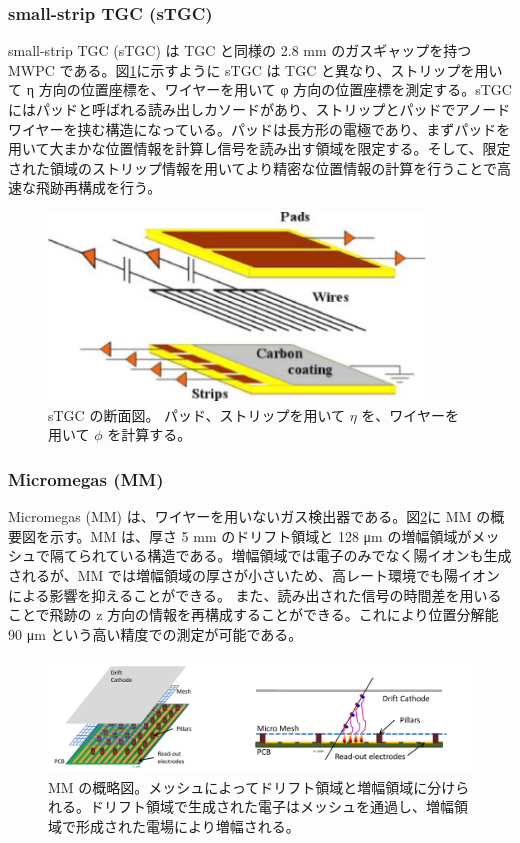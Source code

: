 \subsubsection{small-strip TGC (sTGC)}
small-strip TGC (sTGC) は TGC と同様の 2.8 mm のガスギャップを持つ MWPC である。図\ref{fig:sTGC}に示すように sTGC は TGC と異なり、ストリップを用いて η 方向の位置座標を、ワイヤーを用いて φ 方向の位置座標を測定する。sTGC にはパッドと呼ばれる読み出しカソードがあり、ストリップとパッドでアノードワイヤーを挟む構造になっている。パッドは長方形の電極であり、まずパッドを用いて大まかな位置情報を計算し信号を読み出す領域を限定する。そして、限定された領域のストリップ情報を用いてより精密な位置情報の計算を行うことで高速な飛跡再構成を行う。

\begin{figure}[tb]
  \centering
  \includegraphics[clip, width=10cm]{fig/2/stgc-structure.pdf}
  \caption{sTGC の断面図。 パッド、ストリップを用いて $\eta$ を、ワイヤーを用いて $\phi$ を計算する。}
  \label{fig:sTGC}
\end{figure}

\subsubsection{Micromegas (MM)}
Micromegas (MM) は、ワイヤーを用いないガス検出器である。図\ref{fig:MM}に MM の概要図を示す。MM は、厚さ 5 mm のドリフト領域と 128 μm の増幅領域がメッシュで隔てられている構造である。増幅領域では電子のみでなく陽イオンも生成されるが、MM では増幅領域の厚さが小さいため、高レート環境でも陽イオンによる影響を抑えることができる。
また、読み出された信号の時間差を用いることで飛跡の z 方向の情報を再構成することができる。これにより位置分解能 90 μm という高い精度での測定が可能である。

\begin{figure}[tb]
  \centering
  \includegraphics[clip, width=13cm]{fig/2/mm-structure.pdf}
  \caption{MM の概略図。メッシュによってドリフト領域と増幅領域に分けられる。ドリフト領域で生成された電子はメッシュを通過し、増幅領域で形成された電場により増幅される。}
  \label{fig:MM}
\end{figure}



